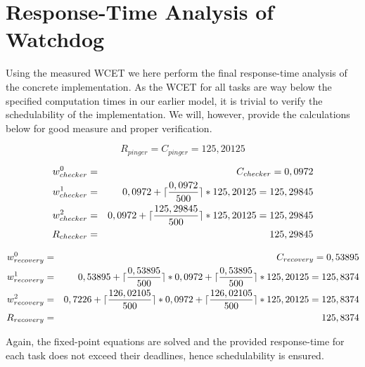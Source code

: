 \section{Response-Time Analysis of Watchdog} %
\label{sec:response_time_analysis_of_watchdog}
Using the measured WCET we here perform the final response-time analysis of the concrete implementation. As the WCET for all tasks are way below the specified computation times in our earlier model, it is trivial to verify the schedulability of the implementation. We will, however, provide the calculations below for good measure and proper verification.

\begin{equation}
\label{eq:pingerrta}
     R_{pinger} = C_{pinger} = 125,20125
\end{equation}

\begin{eqnarray}
    w_{checker}^0 &=& C_{checker} = 0,0972 \nonumber \\ 
    w_{checker}^1 &=& 0,0972 + \lceil\frac{0,0972}{500}\rceil*125,20125 = 125,29845 \nonumber \\ 
    w_{checker}^2 &=& 0,0972 + \lceil\frac{125,29845}{500}\rceil*125,20125 = 125,29845 \nonumber \\
    R_{checker} &=& 125,29845
\end{eqnarray}

\begin{eqnarray}
    w_{recovery}^0 &=& C_{recovery} = 0,53895 \nonumber \\ 
    w_{recovery}^1 &=& 0,53895 + \lceil\frac{0,53895}{500}\rceil*0,0972 + \lceil\frac{0,53895}{500}\rceil*125,20125 = 125,8374 \nonumber \\ 
    w_{recovery}^2 &=& 0,7226 + \lceil\frac{126,02105}{500}\rceil*0,0972 + \lceil\frac{126,02105}{500}\rceil*125,20125 = 125,8374 \nonumber \\
    R_{recovery} &=& 125,8374
\end{eqnarray}

Again, the fixed-point equations are solved and the provided response-time for each task does not exceed their deadlines, hence schedulability is ensured.

